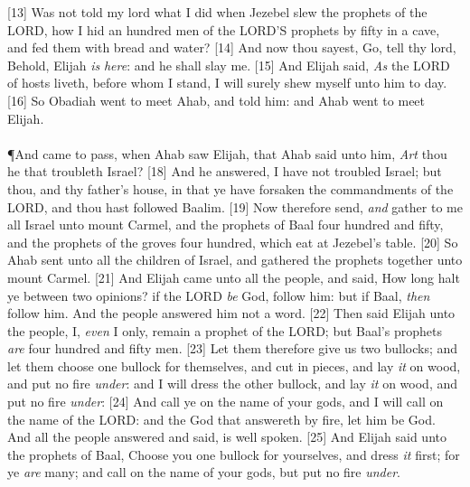 [13] \textcolor[cmyk]{0.99998,1,0,0}{Was  not told my lord what I did when Jezebel slew the prophets of the LORD, how I hid an hundred men of the LORD'S prophets by fifty in a cave, and fed them with bread and water?}
[14] \textcolor[cmyk]{0.99998,1,0,0}{And now thou sayest, Go, tell thy lord, Behold, Elijah \emph{is} \emph{here}: and he shall slay me.}
[15] \textcolor[cmyk]{0.99998,1,0,0}{And Elijah said, \emph{As} the LORD of hosts liveth, before whom I stand, I will surely shew myself unto him to day.}
[16] \textcolor[cmyk]{0.99998,1,0,0}{So Obadiah went to meet Ahab, and told him: and Ahab went to meet Elijah.}\\
\\
\P  \textcolor[cmyk]{0.99998,1,0,0}{And  came to pass, when Ahab saw Elijah, that Ahab said unto him, \emph{Art} thou he that troubleth Israel?}
[18] \textcolor[cmyk]{0.99998,1,0,0}{And he answered, I have not troubled Israel; but thou, and thy father's house, in that ye have forsaken the commandments of the LORD, and thou hast followed Baalim.}
[19] \textcolor[cmyk]{0.99998,1,0,0}{Now therefore send, \emph{and} gather to me all Israel unto mount Carmel, and the prophets of Baal four hundred and fifty, and the prophets of the groves four hundred, which eat at Jezebel's table.}
[20] \textcolor[cmyk]{0.99998,1,0,0}{So Ahab sent unto all the children of Israel, and gathered the prophets together unto mount Carmel.}
[21] \textcolor[cmyk]{0.99998,1,0,0}{And Elijah came unto all the people, and said, How long halt ye between two opinions? if the LORD \emph{be} God, follow him: but if Baal, \emph{then} follow him. And the people answered him not a word.}
[22] \textcolor[cmyk]{0.99998,1,0,0}{Then said Elijah unto the people, I, \emph{even} I only, remain a prophet of the LORD; but Baal's prophets \emph{are} four hundred and fifty men.}
[23] \textcolor[cmyk]{0.99998,1,0,0}{Let them therefore give us two bullocks; and let them choose one bullock for themselves, and cut  in pieces, and lay \emph{it} on wood, and put no fire \emph{under}: and I will dress the other bullock, and lay \emph{it} on wood, and put no fire \emph{under}:}
[24] \textcolor[cmyk]{0.99998,1,0,0}{And call ye on the name of your gods, and I will call on the name of the LORD: and the God that answereth by fire, let him be God. And all the people answered and said,  is well spoken.}
[25] \textcolor[cmyk]{0.99998,1,0,0}{And Elijah said unto the prophets of Baal, Choose you one bullock for yourselves, and dress \emph{it} first; for ye \emph{are} many; and call on the name of your gods, but put no fire \emph{under}.}
